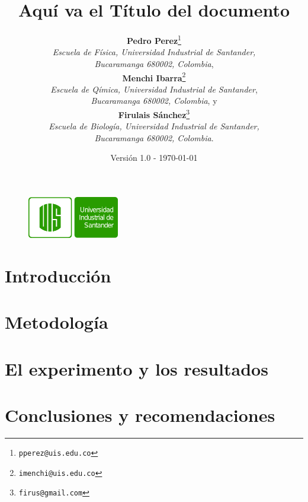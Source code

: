 \documentclass[spanish,notitlepage,letterpaper,11pt]{article} %
\begin{document}
\begin{figure}
{\includegraphics[width=40mm]{figuras/logouis}} 
\end{figure}
\title{\bf Aquí va el Título del documento}
\author{
\textbf{Pedro Perez}\thanks{\texttt{pperez@uis.edu.co}} \\
\textit{Escuela de F\'isica, Universidad Industrial de Santander,}\\ 
\textit{Bucaramanga 680002, Colombia}, \\
\textbf{Menchi Ibarra}\thanks{\texttt{imenchi@uis.edu.co}} \\
\textit{Escuela de Q\'imica, Universidad Industrial de Santander},\\ 
\textit{Bucaramanga 680002, Colombia},  y \\
\textbf{Firulais Sánchez}\thanks{\texttt{firus@gmail.com}} \\
\textit{Escuela de Biología, Universidad Industrial de Santander,  }\\ 
\textit{Bucaramanga 680002, Colombia}. 
}
\date{Versión 1.0 - \today}
\maketitle
\tableofcontents

\begin{abstract}

\end{abstract}

\section{Introducción}



\section{Metodología}
\label{Metodologia}



\section{El experimento y los resultados}
\label{Resultados}





\section{Conclusiones y recomendaciones}
\label{Conclusiones}







\begin{thebibliography}{}


\end{thebibliography}
\end{document}

